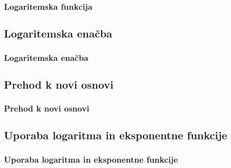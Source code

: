         \begin{frame}
            \frametitle{Logaritemska funkcija}
        \end{frame}

    \subsection{Logaritemska enačba}

        \begin{frame}
            \frametitle{Logaritemska enačba}
        \end{frame}

    \subsection{Prehod k novi osnovi}

        \begin{frame}
            \frametitle{Prehod k novi osnovi}
        \end{frame}

    \subsection{Uporaba logaritma in eksponentne funkcije}

        \begin{frame}
            \frametitle{Uporaba logaritma in eksponentne funkcije}
        \end{frame}

